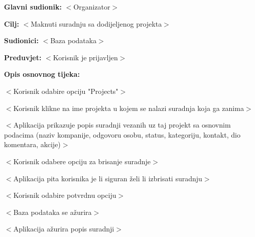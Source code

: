 					\noindent {}
					\begin{packed_item}

						\item \textbf{Glavni sudionik:} $<$Organizator$>$
						\item \textbf{Cilj:} $<$Maknuti suradnju sa dodijeljenog projekta$>$
						\item \textbf{Sudionici:} $<$Baza podataka$>$
						\item \textbf{Preduvjet:} $<$Korisnik je prijavljen$>$
						\item \textbf{Opis osnovnog tijeka:}

						\item[] \begin{packed_enum}

							\item $<$Korisnik odabire opciju "Projects"$>$
							\item $<$Korisnik klikne na ime projekta u kojem se nalazi suradnja koja ga zanima$>$
							\item $<$Aplikacija prikazuje popis suradnji vezanih uz taj projekt sa osnovnim podacima (naziv kompanije, odgovoru osobu, status, kategoriju, kontakt, dio komentara, akcije)$>$
                            \item $<$Korisnik odabere opciju za brisanje suradnje$>$
                            \item $<$Aplikacija pita korisnika je li siguran želi li izbrisati suradnju$>$
                            \item $<$Korisnik odabire potvrdnu opciju$>$
                            \item $<$Baza podataka se ažurira$>$
                            \item $<$Aplikacija ažurira popis suradnji$>$
                            
						\end{packed_enum}
					\end{packed_item}

